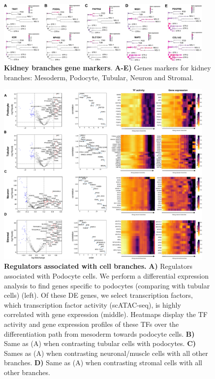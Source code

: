 \begin{figure}[!ht]
  \centering
  \includegraphics[width=0.95\textwidth]{kidney_markers//fig}
  \vspace{0.1cm}
        \caption[Kidney branches gene markers.]{\textbf{Kidney branches gene markers}. \textbf{A-E)} Genes markers for kidney branches: Mesoderm, Podocyte, Tubular, Neuron and Stromal. }
  \label{supfig:kidney-markers}
\end{figure}

\begin{figure}[!ht]
  \centering
  \includegraphics[width=0.95\textwidth]{TF_diff//fig}
  \vspace{0.1cm}
        \caption[Regulators associated with cell branches.]{\textbf{Regulators associated with cell branches.} \textbf{A)} Regulators associated with Podocyte cells. We perform a differential expression analysis to find genes specific to podocytes (comparing with tubular cells) (left). Of these DE genes, we select transcription factors, which transcription factor activity (scATAC-seq), is highly correlated with gene expression (middle). Heatmaps display the TF activity and gene expression profiles of these TFs over the differentiation path from mesoderm towards podocyte cells. \textbf{B)} Same as (A) when contrasting tubular cells with podocytes. \textbf{C)} Sames as (A) when contrasting neuronal/muscle cells with all other branches. \textbf{D)} Same as (A) when contrasting stromal cells with all other branches.}
  \label{supfig:TF-diff}
\end{figure}



